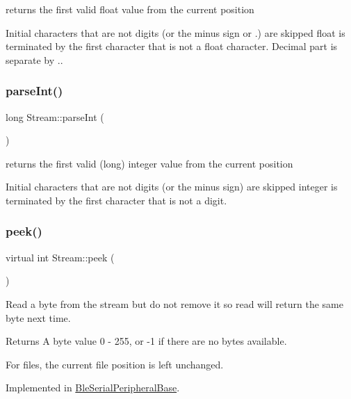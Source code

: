 returns the first valid float value from the current position 

Initial characters that are not digits (or the minus sign or .) are skipped float is terminated by the first character that is not a float character. Decimal part is separate by \textquotesingle{}.\textquotesingle{}. \mbox{\label{class_stream_a497ffcbcb4d5bb889a8fde487bcc1b98}} 
\subsubsection{\texorpdfstring{parse\+Int()}{parseInt()}}
{\footnotesize\ttfamily long Stream\+::parse\+Int (\begin{DoxyParamCaption}{ }\end{DoxyParamCaption})}



returns the first valid (long) integer value from the current position 

Initial characters that are not digits (or the minus sign) are skipped integer is terminated by the first character that is not a digit. \mbox{\label{class_stream_a30c3c212ec6ea67277a708c5ea2501a5}} 
\subsubsection{\texorpdfstring{peek()}{peek()}}
{\footnotesize\ttfamily virtual int Stream\+::peek (\begin{DoxyParamCaption}{ }\end{DoxyParamCaption})\hspace{0.3cm}{\ttfamily [pure virtual]}}



Read a byte from the stream but do not remove it so read will return the same byte next time. 

\begin{DoxyReturn}{Returns}
A byte value 0 -\/ 255, or -\/1 if there are no bytes available.
\end{DoxyReturn}
For files, the current file position is left unchanged. 

Implemented in \mbox{\hyperlink{class_ble_serial_peripheral_base_a6ba8319f3b1a69c96c4e8b3f8dde5bbc}{Ble\+Serial\+Peripheral\+Base}}.

